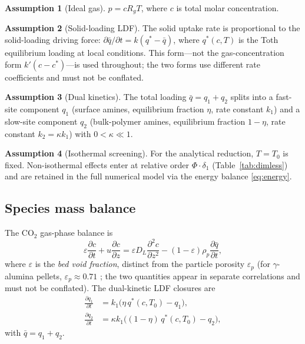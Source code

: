 \documentclass[a4paper]{amsart}
\theoremstyle{definition}
\newtheorem{assumption}{Assumption}
\begin{document}
\begin{assumption}[Ideal gas]\label{ass:ig}
$p = cR_gT$, where $c$ is total molar concentration.
\end{assumption}

\begin{assumption}[Solid-loading LDF]\label{ass:ldf}
The solid uptake rate is proportional to the solid-loading driving force:
$\partial\bar{q}/\partial t = k(q^* - \bar{q})$, where $q^*(c,T)$ is the
Toth equilibrium loading at local conditions.  This form---not the
gas-concentration form $k'(c-c^*)$---is used throughout; the two forms use
different rate coefficients and must not be conflated.
\end{assumption}

\begin{assumption}[Dual kinetics]\label{ass:dk}
The total loading $\bar{q}=q_1+q_2$ splits into a fast-site component $q_1$
(surface amines, equilibrium fraction $\eta$, rate constant $k_1$) and a
slow-site component $q_2$ (bulk-polymer amines, equilibrium fraction $1-\eta$,
rate constant $k_2 = \kappa k_1$) with $0 < \kappa \ll 1$.
\end{assumption}

\begin{assumption}[Isothermal screening]\label{ass:iso}
For the analytical reduction, $T = T_0$ is fixed.  Non-isothermal effects
enter at relative order $\Phi\cdot\delta_1$ (Table~\ref{tab:dimless}) and
are retained in the full numerical model via the energy balance
\eqref{eq:energy}.
\end{assumption}

\subsection{Species mass balance}

The CO$_2$ gas-phase balance is
\begin{equation}
  \varepsilon\frac{\partial c}{\partial t}
  + u\frac{\partial c}{\partial z}
  = \varepsilon D_L\frac{\partial^2 c}{\partial z^2}
    - (1-\varepsilon)\rho_p\frac{\partial\bar{q}}{\partial t},
  \label{eq:gas}
\end{equation}
where $\varepsilon$ is the \emph{bed void fraction}, distinct from the particle
porosity $\varepsilon_p$ (for $\gamma$-alumina pellets, $\varepsilon_p\approx0.71$
\cite{Stampi2024}; the two quantities appear in separate correlations and must
not be conflated).  The dual-kinetic LDF closures are
\begin{align}
  \frac{\partial q_1}{\partial t}
    &= k_1\bigl(\eta\,q^*(c,T_0) - q_1\bigr),
  \label{eq:q1}\\
  \frac{\partial q_2}{\partial t}
    &= \kappa k_1\bigl((1-\eta)\,q^*(c,T_0) - q_2\bigr),
  \label{eq:q2}
\end{align}
with $\bar{q}=q_1+q_2$.
\end{document}
